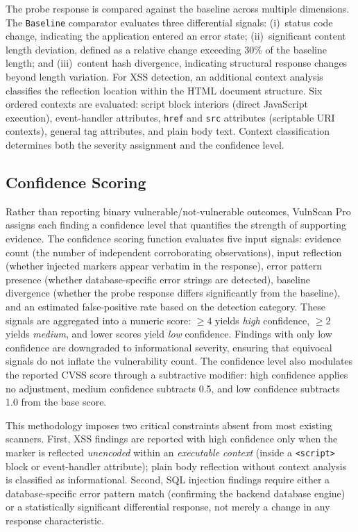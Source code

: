 \documentclass[conference]{IEEEtran}
\begin{document}
The probe response is compared against the baseline across multiple dimensions. The \texttt{Baseline} comparator evaluates three differential signals: (i)~status code change, indicating the application entered an error state; (ii)~significant content length deviation, defined as a relative change exceeding 30\% of the baseline length; and (iii)~content hash divergence, indicating structural response changes beyond length variation. For XSS detection, an additional context analysis classifies the reflection location within the HTML document structure. Six ordered contexts are evaluated: script block interiors (direct JavaScript execution), event-handler attributes, \texttt{href} and \texttt{src} attributes (scriptable URI contexts), general tag attributes, and plain body text. Context classification determines both the severity assignment and the confidence level.

\subsection{Confidence Scoring}

Rather than reporting binary vulnerable/not-vulnerable outcomes, VulnScan Pro assigns each finding a confidence level that quantifies the strength of supporting evidence. The confidence scoring function evaluates five input signals: evidence count (the number of independent corroborating observations), input reflection (whether injected markers appear verbatim in the response), error pattern presence (whether database-specific error strings are detected), baseline divergence (whether the probe response differs significantly from the baseline), and an estimated false-positive rate based on the detection category. These signals are aggregated into a numeric score: $\geq 4$ yields \textit{high} confidence, $\geq 2$ yields \textit{medium}, and lower scores yield \textit{low} confidence. Findings with only low confidence are downgraded to informational severity, ensuring that equivocal signals do not inflate the vulnerability count. The confidence level also modulates the reported CVSS score through a subtractive modifier: high confidence applies no adjustment, medium confidence subtracts 0.5, and low confidence subtracts 1.0 from the base score.

This methodology imposes two critical constraints absent from most existing scanners. First, XSS findings are reported with high confidence only when the marker is reflected \textit{unencoded} within an \textit{executable context} (inside a \texttt{<script>} block or event-handler attribute); plain body reflection without context analysis is classified as informational. Second, SQL injection findings require either a database-specific error pattern match (confirming the backend database engine) or a statistically significant differential response, not merely a change in any response characteristic.
\end{document}
